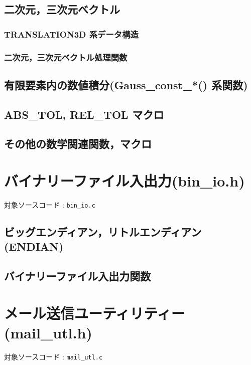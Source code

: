 \documentclass[a4paper,10pt]{jarticle}
\begin{document}
\subsection{二次元，三次元ベクトル}
\subsubsection{TRANSLATION3D 系データ構造}
\subsubsection{二次元，三次元ベクトル処理関数}

\subsection{有限要素内の数値積分(Gauss\_const\_*() 系関数)}

\subsection{ABS\_TOL, REL\_TOL マクロ}

\subsection{その他の数学関連関数，マクロ}


\section{バイナリーファイル入出力(bin\_io.h)}
対象ソースコード : \verb|bin_io.c|

\subsection{ビッグエンディアン，リトルエンディアン(ENDIAN)}

\subsection{バイナリーファイル入出力関数}


\section{メール送信ユーティリティー(mail\_utl.h)}
対象ソースコード : \verb|mail_utl.c|
\end{document}
